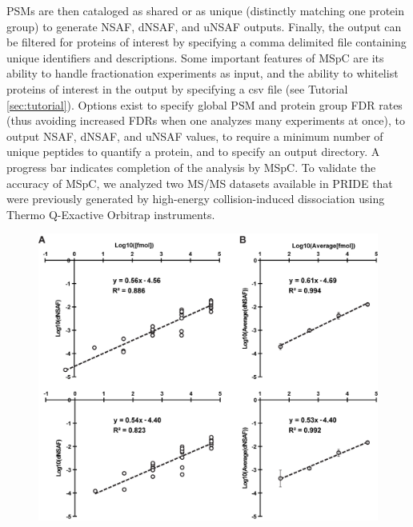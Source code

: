 PSMs are then cataloged as shared or as unique (distinctly matching one protein group) to generate NSAF, dNSAF, and uNSAF outputs.
Finally, the output can be filtered for proteins of interest by specifying a comma delimited file containing unique identifiers and descriptions.
Some important features of MSpC are its ability to handle fractionation experiments as input, and the ability to whitelist proteins of interest in the output by specifying a csv file (see Tutorial \ref{sec:tutorial}).
Options exist to specify global PSM and protein group FDR rates (thus avoiding increased FDRs when one analyzes many experiments at once), to output NSAF, dNSAF, and uNSAF values, to require a minimum number of unique peptides to quantify a protein, and to specify an output directory.
A progress bar indicates completion of the analysis by MSpC.
To validate the accuracy of MSpC, we analyzed two MS/MS datasets available in PRIDE that were previously generated by high-energy collision-induced dissociation using Thermo Q-Exactive Orbitrap instruments.
\begin{figure}[p]
	\centering
	\includegraphics[width=\columnwidth]{MSpC/figure1.png}
	\label{fig:UPS2}
\end{figure}

